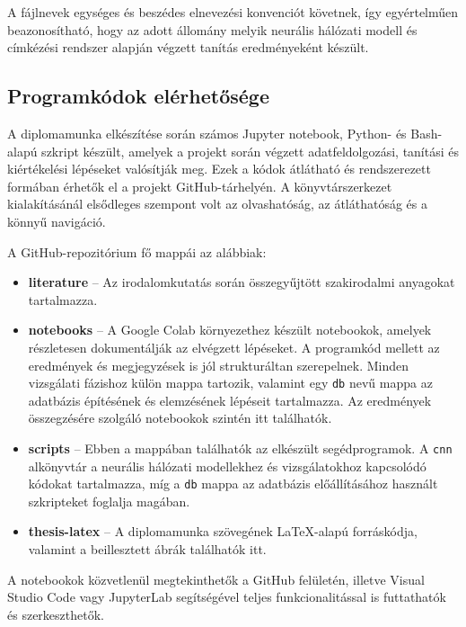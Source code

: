         A fájlnevek egységes és beszédes elnevezési konvenciót követnek, így egyértelműen beazonosítható, hogy az adott állomány melyik neurális hálózati modell és címkézési rendszer alapján végzett tanítás eredményeként készült.

        \subsection{Programkódok elérhetősége}

        A diplomamunka elkészítése során számos Jupyter notebook, Python- és Bash-alapú szkript készült, amelyek a projekt során végzett adatfeldolgozási, tanítási és kiértékelési lépéseket valósítják meg. Ezek a kódok átlátható és rendszerezett formában érhetők el a projekt GitHub-tárhelyén. A könyvtárszerkezet kialakításánál elsődleges szempont volt az olvashatóság, az átláthatóság és a könnyű navigáció.
        
        A GitHub-repozitórium fő mappái az alábbiak:
        
        \begin{itemize}
            \item \textbf{literature} – Az irodalomkutatás során összegyűjtött szakirodalmi anyagokat tartalmazza.
            
            \item \textbf{notebooks} – A Google Colab környezethez készült notebookok, amelyek részletesen dokumentálják az elvégzett lépéseket. A programkód mellett az eredmények és megjegyzések is jól strukturáltan szerepelnek. Minden vizsgálati fázishoz külön mappa tartozik, valamint egy \texttt{db} nevű mappa az adatbázis építésének és elemzésének lépéseit tartalmazza. Az eredmények összegzésére szolgáló notebookok szintén itt találhatók.
            
            \item \textbf{scripts} – Ebben a mappában találhatók az elkészült segédprogramok. A \texttt{cnn} alkönyvtár a neurális hálózati modellekhez és vizsgálatokhoz kapcsolódó kódokat tartalmazza, míg a \texttt{db} mappa az adatbázis előállításához használt szkripteket foglalja magában.
            
            \item \textbf{thesis-latex} – A diplomamunka szövegének LaTeX-alapú forráskódja, valamint a beillesztett ábrák találhatók itt.
        \end{itemize}
        
        A notebookok közvetlenül megtekinthetők a GitHub felületén, illetve Visual Studio Code vagy JupyterLab segítségével teljes funkcionalitással is futtathatók és szerkeszthetők.
        
